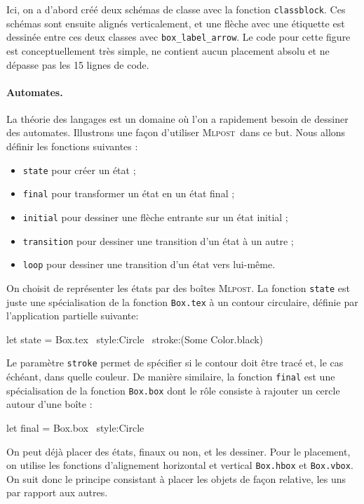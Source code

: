 \documentclass[twoside]{studia-Hermann}
\newcommand{\mlpost}{\textsc{Mlpost}}
\begin{document}
Ici, on a d'abord créé deux schémas de classe avec la fonction
\texttt{classblock}. Ces schémas sont ensuite alignés verticalement,
et une flèche avec une étiquette est dessinée entre ces deux classes
avec \texttt{box\_label\_arrow}. Le code pour cette figure est
conceptuellement très simple, ne contient aucun placement absolu et ne
dépasse pas les 15 lignes de code.

\paragraph{Automates.}\label{sec:automates}
La théorie des langages est un domaine où l'on a  rapidement besoin de
dessiner des automates. Illustrons une façon 
d'utiliser \mlpost\ dans ce but. Nous allons définir les fonctions 
suivantes :
\begin{itemize}
\item \texttt{state} pour créer un état ;
\item \texttt{final} pour transformer un état en un état final ;
\item \texttt{initial} pour dessiner une flèche entrante sur un état initial ;
\item \texttt{transition} pour dessiner une transition d'un état à un autre ;
\item \texttt{loop} pour dessiner une transition d'un état vers lui-même.
\end{itemize}
On choisit de représenter les états par des boîtes \mlpost.  La
fonction \texttt{state} est juste une spé\-ci\-ali\-sa\-tion de la
fonction {\tt Box.tex} à un contour circulaire, définie par
l'application partielle suivante:
\begin{ocaml}
let state = Box.tex ~style:Circle ~stroke:(Some Color.black)
\end{ocaml}
Le paramètre \texttt{stroke} permet de spécifier si le contour doit
être tracé et, le cas échéant, dans quelle couleur. De manière
similaire, la fonction \texttt{final} est une spécialisation de la
fonction {\tt Box.box} dont le rôle consiste à rajouter un cercle
autour d'une boîte :
\begin{ocaml}
let final = Box.box ~style:Circle
\end{ocaml}

On peut déjà placer des états, finaux ou non,
et  les  dessiner.   Pour  le  placement,  on  utilise  les  fonctions
d'alignement    horizontal    et    vertical   \texttt{Box.hbox}    et
\texttt{Box.vbox}. On  suit donc le  principe consistant à  placer les
objets de façon relative, les uns par rapport aux autres.
\end{document}
